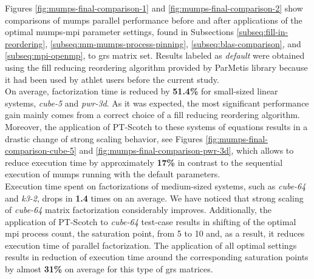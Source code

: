 \label{subseq:final-results}


Figures \ref{fig:mumps-final-comparison-1} and \ref{fig:mumps-final-comparison-2} show comparisons of \acrshort{mumps} parallel performance before and after applications of the optimal \acrshort{mumps}-\acrshort{mpi}  parameter settings, found in Subsections \ref{subseq:fill-in-reordering}, \ref{subseq:mm-mumps-process-pinning}, \ref{subseq:blas-comparison}, and \ref{subseq:mpi-openmp}, to \acrshort{grs} matrix set. Results labeled as \textit{default} were obtained using the fill reducing reordering algorithm provided by ParMetis library because it had been used by \acrshort{athlet} users before the current study.\\



On average, factorization time is reduced by \textbf{51.4\%} for small-sized linear systems, \textit{cube-5} and \textit{pwr-3d}. As it was expected, the most significant performance gain mainly comes from a correct choice of a fill reducing reordering algorithm. Moreover, the application of PT-Scotch to these systems of equations results in a drastic change of strong scaling behavior, see Figures \ref{fig:mumps-final-comparison-cube-5} and  \ref{fig:mumps-final-comparison-pwr-3d}, which allows to reduce execution time by approximately \textbf{17\%} in contrast to the sequential execution of \acrshort{mumps} running with the default parameters.\\


Execution time spent on factorizations of medium-sized systems, such as \textit{cube-64} and \textit{k3-2}, drops in \textbf{1.4} times on an average. We have noticed that strong scaling of \textit{cube-64} matrix factorization considerably improves. Additionally, the application of PT-Scotch to \textit{cube-64} test-case results in shifting of the optimal \acrshort{mpi} process count, the saturation point, from 5 to 10 and, as a result, it reduces execution time of parallel factorization. The application of all optimal settings results in reduction of execution time around the corresponding saturation points by almost \textbf{31\%} on average for this type of \acrshort{grs} matrices.\\





